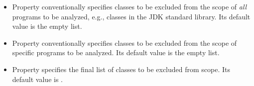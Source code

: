 \begin{itemize}
\item
Property  conventionally specifies
classes to be excluded from the scope of {\it all} programs to be
analyzed, e.g., classes in the JDK standard library.  Its default
value is the empty list.
\item
Property  conventionally specifies
classes to be excluded from the scope of specific programs to be
analyzed.  Its default value is the empty list.
\item
Property  specifies the final list of
classes to be excluded from scope.  Its default value is
.
\end{itemize}


